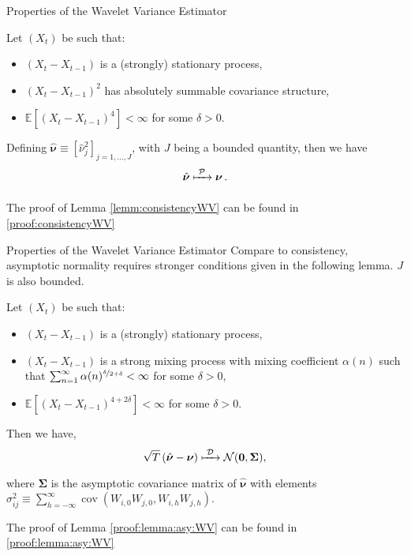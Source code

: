 \documentclass[envcountsect,usenames,dvipsnames]{beamer}
\DeclareMathOperator*{\cov}{cov}
\theoremstyle{mystyle}
\begin{document}
\begin{frame}{Properties of the Wavelet Variance Estimator}

\begin{Lemma}[Consistency]
\label{lemm:consistencyWV}
    Let $(X_t)$ be such that:
    \begin{itemize}
        \item $(X_t - X_{t-1})$ is a (strongly) stationary process,
        \item $(X_t - X_{t-1})^2$ has absolutely summable covariance structure,
        \item $\mathbb{E}\left[(X_t - X_{t-1})^4 \right] < \infty$ for some $\delta > 0$.
    \end{itemize}
    Defining $\hat{\bm{\nu}} \equiv [\hat{\nu}_{j}^2]_{j = 1, \dots, J}$, with $J$ being a bounded quantity, then we have $$\hat{\bm{\nu}}  \xmapsto[\;\;\;\;\; ]{\mathcal{P}} \bm{\nu} \,.$$
    
\end{Lemma}  
The proof of Lemma \ref{lemm:consistencyWV} can be found in \ref{proof:consistencyWV} $\;$ \hyperlink{proof:consistencyWV}{}


\end{frame}


\begin{frame}{Properties of the Wavelet Variance Estimator}
	\small
Compare to consistency, asymptotic normality requires stronger conditions given in the following lemma. $J$ is also bounded.
\begin{Lemma}
\label{lemma:asy:WV}
\small
    Let $(X_t)$ be such that:
    \begin{itemize}
        \item $(X_t - X_{t-1})$ is a (strongly) stationary process,
        \item $(X_t - X_{t-1})$ is a strong mixing process with mixing coefficient $\alpha(n)$ such that $\sum_{n=1}^{\infty} \alpha(n)^{\nicefrac{\delta}{2+\delta}} < \infty$ for some $\delta > 0$,
        \item $\mathbb{E}\left[(X_t - X_{t-1})^{4+2\delta}\right] < \infty$ for some $\delta > 0$.
    \end{itemize}
    Then we have, $$\sqrt{T}   \left(\hat{\bm{\nu}} - \bm{\nu} \right) \xmapsto[\;\;\;\;\; ]{\mathcal{D}} \mathcal{N}(\mathbf{0},\bm{\Sigma}),$$ where $\bm{\Sigma}$ is the asymptotic covariance matrix of $\hat{\bm{\nu}}$ with elements $\sigma^2_{ij} \equiv \sum_{h = -\infty}^{\infty}\cov\left(W_{i,0}W_{j,0}, W_{i,h}W_{j,h} \right)$.
\end{Lemma}
\small
The proof of Lemma \ref{proof:lemma:asy:WV} can be found in \ref{proof:lemma:asy:WV} $\;$ \hyperlink{proof:lemma:asy:WV}{}
\end{frame}
\end{document}
